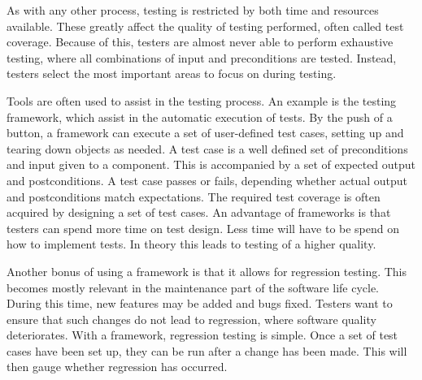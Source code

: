 As with any other process, testing is restricted by both time and resources available. These greatly affect the quality of testing performed, often called test coverage. Because of this, testers are almost never able to perform exhaustive testing, where all combinations of input and preconditions are tested. Instead, testers select the most important areas to focus on during testing.  

Tools are often used to assist in the testing process. An example is the testing framework, which assist in the automatic execution of tests. By the push of a button, a framework can execute a set of user-defined test cases, setting up and tearing down objects as needed. A test case is a well defined set of preconditions and input given to a component. This is  accompanied by a set of expected output and postconditions. A test case passes or fails, depending whether actual output and postconditions match expectations.  The required test coverage is often acquired by designing a set of test cases. An advantage of frameworks is that testers can spend more time on test design. Less time will have to be spend on how to implement tests. In theory this leads to testing of a higher quality.

Another bonus of using a framework is that it allows for regression testing. This becomes mostly relevant in the maintenance part of the software life cycle. During this time, new features may be added and bugs fixed. Testers want to ensure that such changes do not lead to regression,  where software quality deteriorates. With a framework, regression testing is simple. Once a set of test cases have been set up, they can be run after a change has been made. This will then gauge whether regression has occurred.



